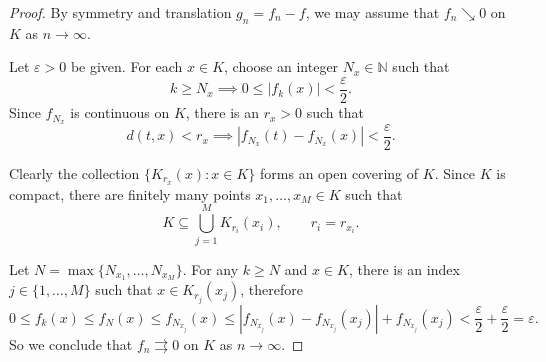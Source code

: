 \documentclass[11pt]{article}
\begin{document}
\begin{proof}
  By symmetry and translation $g_n = f_n - f$, we may assume that $f_n \searrow 0$ on $K$ as $n \to \infty$.

  Let $\varepsilon > 0$ be given.
  For each $x \in K$, choose an integer $N_x \in \mathbb{N}$ such that
  \[
    k \geqslant N_x \implies 0 \leqslant |f_k(x)| < \frac{\varepsilon}{2}.
  \]
  Since $f_{N_x}$ is continuous on $K$, there is an $r_x > 0$ such that
  \[
    d(t,x) < r_x \implies |f_{N_x}(t) - f_{N_x}(x)| < \frac{\varepsilon}{2}.
  \]

  Clearly the collection $\{ K_{r_x}(x) \colon x \in K \}$ forms an open covering of $K$.
  Since $K$ is compact, there are finitely many points $x_1, \dots, x_M \in K$ such that
  \[
    K \subseteq \bigcup_{j=1}^M K_{r_i}(x_i), \qquad r_i = r_{x_i}.
  \]

  Let $N = \max \{ N_{x_1}, \dots, N_{x_M} \}$.
  For any $k \geqslant N$ and $x \in K$, there is an index $j \in \{1, \dots, M\}$ such that
  $x \in K_{r_j}(x_j)$, therefore
  \[
    0 \leqslant f_k(x) \leqslant f_N(x) \leqslant f_{N_{x_j}}(x) \leqslant |f_{N_{x_j}}(x) - f_{N_{x_j}}(x_j)| + f_{N_{x_j}}(x_j) < \frac{\varepsilon}{2} + \frac{\varepsilon}{2} = \varepsilon.
  \]
  So we conclude that $f_n \rightrightarrows 0$ on $K$ as $n \to \infty$.
\end{proof}
\end{document}
